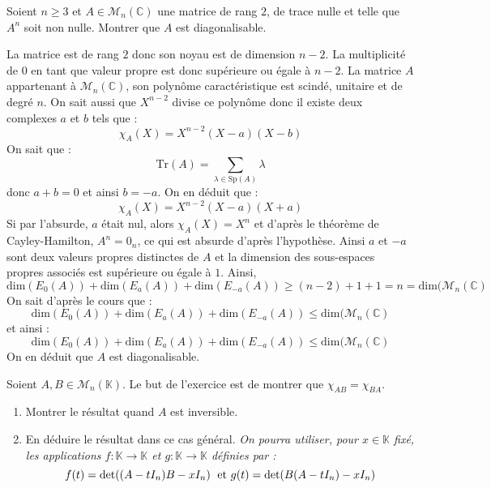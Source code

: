\documentclass[a4paper,10pt]{report}
\begin{document}
\begin{Exercice}{} Soient $n \geq 3$ et $A \in \mathcal{M}_{n}(\mathbb{C})$ une matrice de rang $2$, de trace nulle et telle que $A^n$ soit non nulle. Montrer que $A$ est diagonalisable.
\end{Exercice}

\corr La matrice est de rang $2$ donc son noyau est de dimension $n-2$. La multiplicité de $0$ en tant que valeur propre est donc supérieure ou égale à $n-2$. La matrice $A$ appartenant à $\mathcal{M}_{n}(\mathbb{C})$, son polynôme caractéristique est scindé, unitaire et de degré $n$. On sait aussi que $X^{n-2}$ divise ce polynôme donc il existe deux complexes $a$ et $b$ tels que :
$$ \chi_A(X)= X^{n-2} (X-a)(X-b)$$
On sait que :
$$ \textrm{Tr}(A) = \sum_{\lambda \in \textrm{Sp}(A)} \lambda$$
donc $a+b=0$ et ainsi $b=-a$. On en déduit que :
$$ \chi_A(X)= X^{n-2} (X-a)(X+a)$$
Si par l'absurde, $a$ était nul, alors $\chi_A(X)=X^n$ et d'après le théorème de Cayley-Hamilton, $A^n= 0_n$, ce qui est absurde d'après l'hypothèse. Ainsi $a$ et $-a$ sont deux valeurs propres distinctes de $A$ et la dimension des sous-espaces propres associés est supérieure ou égale à $1$. Ainsi,
$$ \textrm{dim}(E_0(A)) + \textrm{dim}(E_a(A)) + \textrm{dim}(E_{-a}(A)) \geq (n-2)+1+1 = n = \textrm{dim}(\mathcal{M}_n(\mathbb{C})$$
On sait d'après le cours que :
$$   \textrm{dim}(E_0(A)) + \textrm{dim}(E_a(A)) + \textrm{dim}(E_{-a}(A)) \leq \textrm{dim}(\mathcal{M}_n(\mathbb{C})$$
et ainsi :
$$   \textrm{dim}(E_0(A)) + \textrm{dim}(E_a(A)) + \textrm{dim}(E_{-a}(A)) \leq \textrm{dim}(\mathcal{M}_n(\mathbb{C})$$
On en déduit que $A$ est diagonalisable.

\begin{Exercice}{} Soient $A,B \in \mathcal{M}_{n}(\mathbb{K})$. Le but de l'exercice est de montrer que $\chi_{AB} = \chi_{BA}$.
\begin{enumerate}
\item Montrer le résultat quand $A$ est inversible.
\item En déduire le résultat dans ce cas général. \textit{On pourra utiliser, pour $x \in \mathbb{K}$ fixé, les applications $f : \mathbb{K} \rightarrow \mathbb{K}$ et $g : \mathbb{K} \rightarrow \mathbb{K}$ définies par :}
$$ f(t) = \textrm{det}((A-t I_n)B -x I_n) \; \hbox{ et } g(t) = \textrm{det}(B(A-tI_n)-xI_n)$$
\end{enumerate}
\end{Exercice}

\corr 
\end{document}
